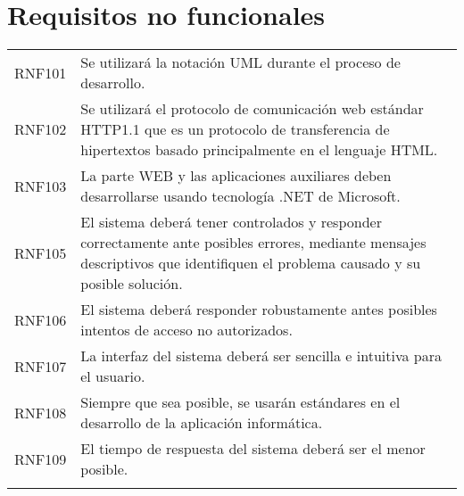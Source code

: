 \section{Requisitos no funcionales}
\begin{longtable}{lp{14cm}}
  RNF101\label{RNF101} & Se utilizará la notación UML durante el proceso de desarrollo. \\
  RNF102\label{RNF102} & Se utilizará el protocolo de comunicación web estándar HTTP1.1 que es un protocolo de transferencia de hipertextos basado principalmente en el lenguaje HTML. \\
  RNF103\label{RNF103} & La parte WEB y las aplicaciones auxiliares deben desarrollarse usando tecnología .NET de Microsoft. \\
  RNF105\label{RNF104} & El sistema deberá tener controlados y responder correctamente ante posibles errores, mediante mensajes descriptivos que identifiquen el problema causado y su posible solución. \\
  RNF106\label{RNF105} & El sistema deberá responder robustamente antes posibles intentos de acceso no autorizados. \\
  RNF107\label{RNF106} & La interfaz del sistema deberá ser sencilla e intuitiva para el usuario. \\
  RNF108\label{RNF107} & Siempre que sea posible, se usarán estándares en el desarrollo de la aplicación informática. \\
  RNF109\label{RNF108} & El tiempo de respuesta del sistema deberá ser el menor posible. \\
  \label{cuadro:requisitos-no-funcionales}
\end{longtable}

\renewcommand{\arraystretch}{1} %